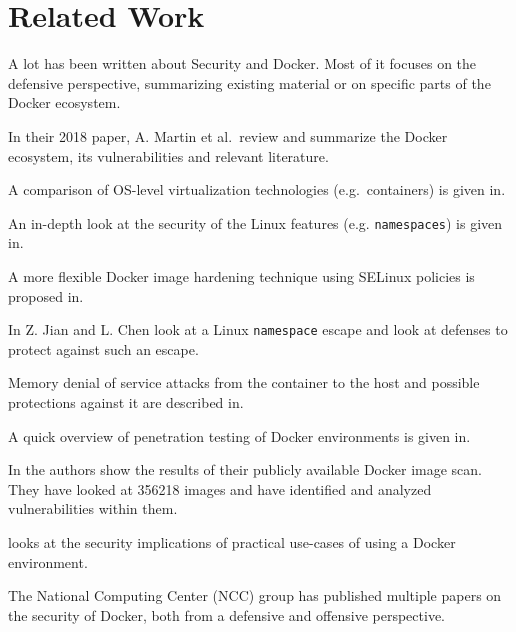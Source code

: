 \chapter{Related Work}\label{chapter:relatedwork}
A lot has been written about Security and Docker. Most of it focuses on the defensive perspective, summarizing existing material or on specific parts of the Docker ecosystem.

\medskip

In their 2018 paper, A. Martin et al.\ review and summarize the Docker ecosystem, its vulnerabilities and relevant literature\cite{Docker-Ecosystem-Vulnerability-Analysis}.

A comparison of OS-level virtualization technologies (e.g.\ containers) is given in\cite{Security-OS-level-Virtualization}.

An in-depth look at the security of the Linux features (e.g. \lstinline{namespaces}) is given in\cite{Analysis-Docker-Security}.

A more flexible Docker image hardening technique using SELinux policies is proposed in\cite{DockerPolicyModules}.

In\cite{Defense-Docker-Escape} Z. Jian and L. Chen look at a Linux \lstinline{namespace} escape and look at defenses to protect against such an escape.

Memory denial of service attacks from the container to the host and possible protections against it are described in\cite{Securing-Docker-Containers-from-DOS}.

A quick overview of penetration testing of Docker environments is given in\cite{Research-Pentesting-Docker-Environment}.

In\cite{Study-Vulnerabilities-Docker-Hub} the authors show the results of their publicly available Docker image scan. They have looked at 356218 images and have identified and analyzed vulnerabilities within them.

\cite{To-Docker-Not-To-Docker} looks at the security implications of practical use-cases of using a Docker environment.

The National Computing Center (NCC) group has published multiple papers on the security of Docker, both from a defensive\cite{Understanding-and-Hardening-Linux-Containers} and offensive\cite{Abusing-Containers} perspective.
